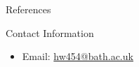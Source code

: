 \documentclass[final]{beamer}
\theoremstyle{plain}
\theoremstyle{definition}
\theoremstyle{remark}
\newlength{\threecolwid}
\begin{document}
\begin{frame}[t]
\begin{columns}[t]
\begin{column}{\threecolwid}
\begin{alertblock}{References}

\nocite{*} %
\tiny{\scalebox {.2}{} 
 \vspace{0.4in}}

\end{alertblock}


\begin{alertblock}{Contact Information} \small

\begin{itemize}
\item Email: \href{mailto:hw454@bath.ac.uk}{hw454@bath.ac.uk}

\end{itemize}

\end{alertblock}







\end{column} %

\end{columns} %

\end{frame} %
\end{document}
